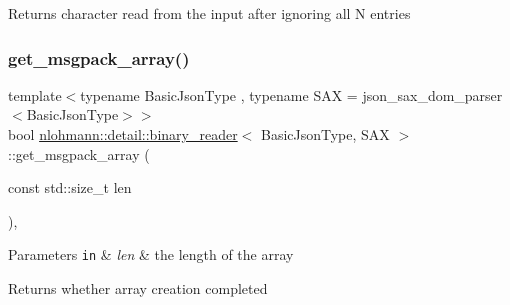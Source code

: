 \begin{DoxyReturn}{Returns}
character read from the input after ignoring all \textquotesingle{}N\textquotesingle{} entries 
\end{DoxyReturn}
\mbox{\label{classnlohmann_1_1detail_1_1binary__reader_a09d3eed7523da6f61e7ffa98823aae2b}} 
\subsubsection{\texorpdfstring{get\+\_\+msgpack\+\_\+array()}{get\_msgpack\_array()}}
{\footnotesize\ttfamily template$<$typename Basic\+Json\+Type , typename S\+AX  = json\+\_\+sax\+\_\+dom\+\_\+parser$<$\+Basic\+Json\+Type$>$$>$ \\
bool \mbox{\hyperlink{classnlohmann_1_1detail_1_1binary__reader}{nlohmann\+::detail\+::binary\+\_\+reader}}$<$ Basic\+Json\+Type, S\+AX $>$\+::get\+\_\+msgpack\+\_\+array (\begin{DoxyParamCaption}\item[{const std\+::size\+\_\+t}]{len }\end{DoxyParamCaption})\hspace{0.3cm}{\ttfamily [inline]}, {\ttfamily [private]}}


\begin{DoxyParams}[1]{Parameters}
\mbox{\tt in}  & {\em len} & the length of the array \\
\hline
\end{DoxyParams}
\begin{DoxyReturn}{Returns}
whether array creation completed 
\end{DoxyReturn}
\mbox{\label{classnlohmann_1_1detail_1_1binary__reader_ad1190bb3499e243b0bbf795743a35563}} 
